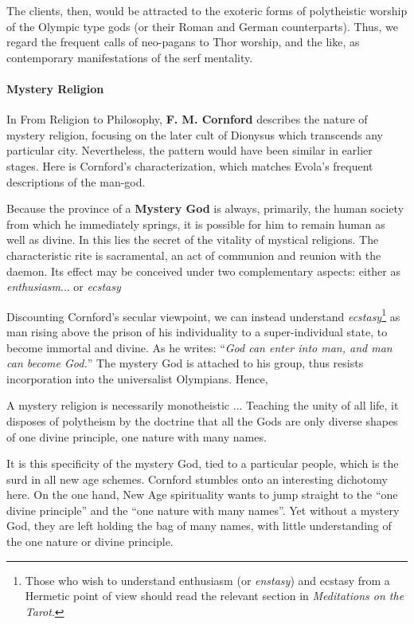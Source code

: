 The clients, then, would be attracted to the exoteric forms of polytheistic worship of the Olympic type gods (or their Roman and German counterparts). Thus, we regard the frequent calls of neo-pagans to Thor worship, and the like, as contemporary manifestations of the serf mentality.

\paragraph{Mystery Religion}


In From Religion to Philosophy, \textbf{F. M. Cornford} describes the nature of mystery religion, focusing on the later cult of Dionysus which transcends any particular city. Nevertheless, the pattern would have been similar in earlier stages. Here is Cornford's characterization, which matches Evola's frequent descriptions of the man-god.

\begin{quotex}
Because the province of a \textbf{Mystery God} is always, primarily, the human society from which he immediately springs, it is possible for him to remain human as well as divine. In this lies the secret of the vitality of mystical religions. The characteristic rite is sacramental, an act of communion and reunion with the daemon. Its effect may be conceived under two complementary aspects: either as \emph{enthusiasm}... or \emph{ecstasy}
\end{quotex}


Discounting Cornford's secular viewpoint, we can instead understand \emph{ecstasy}\footnote{Those who wish to understand enthusiasm (or \emph{enstasy}) and ecstasy from a Hermetic point of view should read the relevant section in \textit{Meditations on the Tarot}.} as man rising above the prison of his individuality to a super-individual state, to become immortal and divine. As he writes: ``\emph{God can enter into man, and man can become God.}'' The mystery God is attached to his group, thus resists incorporation into the universalist Olympians. Hence,

\begin{quotex}
A mystery religion is necessarily monotheistic ... Teaching the unity of all life, it disposes of polytheism by the doctrine that all the Gods are only diverse shapes of one divine principle, one nature with many names.
\end{quotex}


It is this specificity of the mystery God, tied to a particular people, which is the surd in all new age schemes. Cornford stumbles onto an interesting dichotomy here. On the one hand, New Age spirituality wants to jump straight to the ``one divine principle'' and the ``one nature with many names''. Yet without a mystery God, they are left holding the bag of many names, with little understanding of the one nature or divine principle.

